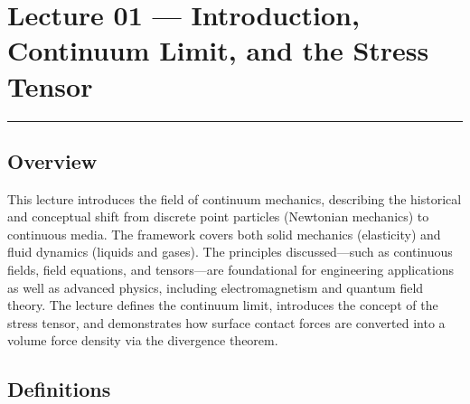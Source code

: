 
\section{Lecture 01 — Introduction, Continuum Limit, and the Stress Tensor}\label{sec:lec01}
\date{March 23, 2026}
\hrule\vspace{1.5em}

\subsection*{Overview}
This lecture introduces the field of continuum mechanics, describing the historical and conceptual shift from discrete point particles (Newtonian mechanics) to continuous media. The framework covers both solid mechanics (elasticity) and fluid dynamics (liquids and gases). The principles discussed—such as continuous fields, field equations, and tensors—are foundational for engineering applications as well as advanced physics, including electromagnetism and quantum field theory. The lecture defines the continuum limit, introduces the concept of the stress tensor, and demonstrates how surface contact forces are converted into a volume force density via the divergence theorem.

\subsection*{Definitions}



